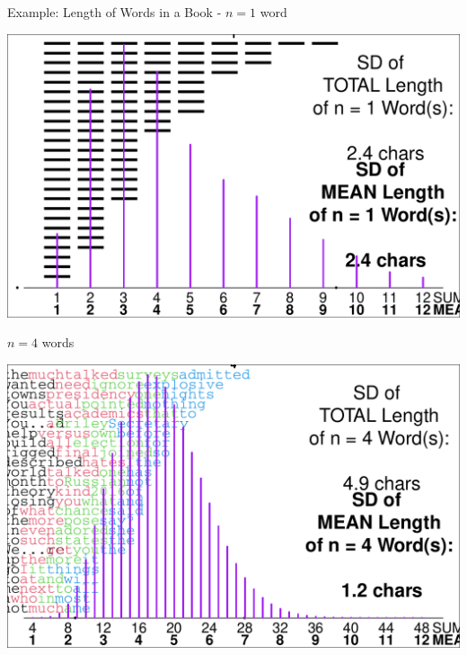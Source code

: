 \documentclass[10pt,handout]{beamer}\usepackage[]{graphicx}\usepackage[]{color}
\makeatletter
\def\maxwidth{ %
  \ifdim\Gin@nat@width>\linewidth
    \linewidth
  \else
    \Gin@nat@width
  \fi
}
\newenvironment{knitrout}{}{} %
\makeatother
\begin{document}
\begin{frame}[fragile]{Example: Length of Words in a Book - $n = 1$ word}
\begin{knitrout}\tiny
{}\color{fgcolor}

{\centering \includegraphics[width=\maxwidth]{figure/unnamed-chunk-12-1} 

}


\end{knitrout}
\end{frame}

\begin{frame}[fragile]{$n = 4$ words}
\begin{knitrout}\tiny
{}\color{fgcolor}

{\centering \includegraphics[width=\maxwidth]{figure/unnamed-chunk-13-1} 

}


\end{knitrout}
\end{frame}
\end{document}
